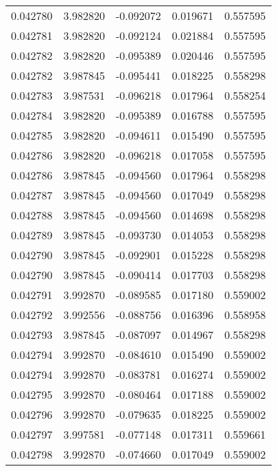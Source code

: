 \begin{tabular}{lrrrr}
0.042780    &  3.982820 & -0.092072 &  0.019671 &             0.557595 \\
0.042781    &  3.982820 & -0.092124 &  0.021884 &             0.557595 \\
0.042782    &  3.982820 & -0.095389 &  0.020446 &             0.557595 \\
0.042782    &  3.987845 & -0.095441 &  0.018225 &             0.558298 \\
0.042783    &  3.987531 & -0.096218 &  0.017964 &             0.558254 \\
0.042784    &  3.982820 & -0.095389 &  0.016788 &             0.557595 \\
0.042785    &  3.982820 & -0.094611 &  0.015490 &             0.557595 \\
0.042786    &  3.982820 & -0.096218 &  0.017058 &             0.557595 \\
0.042786    &  3.987845 & -0.094560 &  0.017964 &             0.558298 \\
0.042787    &  3.987845 & -0.094560 &  0.017049 &             0.558298 \\
0.042788    &  3.987845 & -0.094560 &  0.014698 &             0.558298 \\
0.042789    &  3.987845 & -0.093730 &  0.014053 &             0.558298 \\
0.042790    &  3.987845 & -0.092901 &  0.015228 &             0.558298 \\
0.042790    &  3.987845 & -0.090414 &  0.017703 &             0.558298 \\
0.042791    &  3.992870 & -0.089585 &  0.017180 &             0.559002 \\
0.042792    &  3.992556 & -0.088756 &  0.016396 &             0.558958 \\
0.042793    &  3.987845 & -0.087097 &  0.014967 &             0.558298 \\
0.042794    &  3.992870 & -0.084610 &  0.015490 &             0.559002 \\
0.042794    &  3.992870 & -0.083781 &  0.016274 &             0.559002 \\
0.042795    &  3.992870 & -0.080464 &  0.017188 &             0.559002 \\
0.042796    &  3.992870 & -0.079635 &  0.018225 &             0.559002 \\
0.042797    &  3.997581 & -0.077148 &  0.017311 &             0.559661 \\
0.042798    &  3.992870 & -0.074660 &  0.017049 &             0.559002 \\

\end{tabular}
